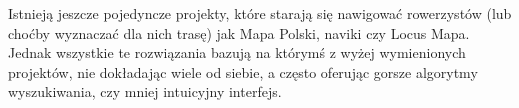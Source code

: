 Istnieją jeszcze pojedyncze projekty, które starają się nawigować rowerzystów (lub choćby wyznaczać dla nich trasę) jak Mapa Polski, naviki czy Locus Mapa. Jednak wszystkie te rozwiązania bazują na którymś z wyżej wymienionych projektów, nie dokładając wiele od siebie, a często oferując gorsze algorytmy wyszukiwania, czy mniej intuicyjny interfejs. 
